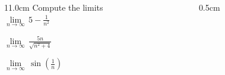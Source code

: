 \begin{frame}
\frametitle{}
\scriptsize

\vspace{0.2cm}

\begin{columns}
\begin{column}{11.0cm}
Compute the limits\\

$\displaystyle{\lim \limits_{n \to \infty}\, 5 - \frac{1}{n^2}}$

\vspace{2.2cm}

$\displaystyle{\lim \limits_{n \to \infty}\, \frac{5n}{\sqrt{n^2+4}}}$

\vspace{2.2cm}

$\displaystyle{\lim \limits_{n \to \infty}\, \sin\left(\frac{1}{n}\right)}$

\vspace{3.5cm}

\end{column}
\begin{column}{0.5cm}
	
\end{column}
\end{columns}
\end{frame}


